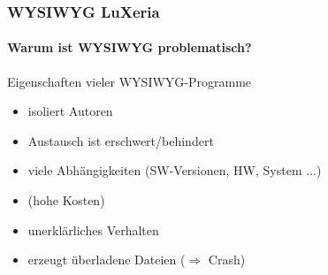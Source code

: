 \begin{frame}
	\frametitle{WYSIWYG \hfill{} LuXeria}
	\framesubtitle{Warum ist WYSIWYG problematisch?}
	\begin{alertblock}{Eigenschaften vieler WYSIWYG-Programme}
		\begin{itemize}
			\item isoliert Autoren
			\item Austausch ist erschwert/behindert
			\item viele Abhängigkeiten (SW-Versionen, HW, System ...)
			\item (hohe Kosten)
			\item unerklärliches Verhalten
			\item erzeugt überladene Dateien ($\Rightarrow$ Crash)
		\end{itemize}
	\end{alertblock}
\end{frame}

